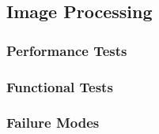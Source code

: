 
\subsection{Image Processing}
\label{sec:verification_image}

\subsubsection{Performance Tests}
\label{sec:image_pt}

\subsubsection{Functional Tests}
\label{sec:image_ft}

\subsubsection{Failure Modes}
\label{sec:image_fm}

